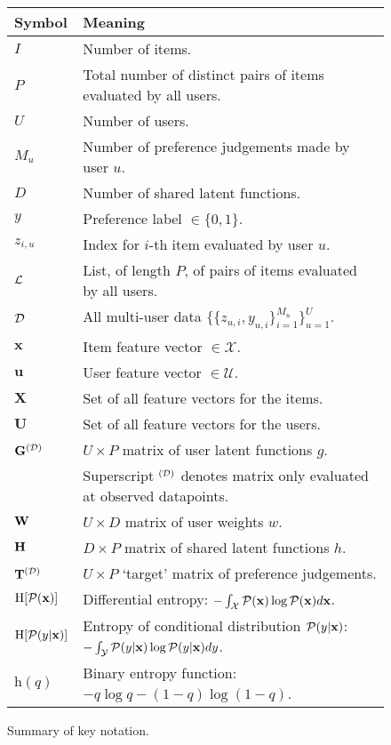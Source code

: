 \begin{figure}[t]
\begin{center}
\begin{tabular}{l|l}
 \bf{Symbol} & \bf{Meaning} \\ \hline
 \hline
 $I$ & Number of items. \\
 $P$ & Total number of distinct pairs of items evaluated by all users. \\
 $U$ & Number of users. \\ 
 $M_u$ & Number of preference judgements made by user $u$. \\
 $D$ & Number of shared latent functions. \\
 $y$ & Preference label $\in\{0,1\}.$ \\
 $z_{i,u}$ & Index for $i$-th item evaluated by user $u$. \\
 $\mathcal{L}$ & List, of length $P$, of pairs of items evaluated by all users. \\
 $\mathcal{D}$ &  All multi-user data $ \{\{z_{u,i},y_{u,i}\}_{i=1}^{M_u}\}_{u=1}^U $. \\
 $\mathbf{x}$ & Item feature vector $\in\mathcal{X}$. \\
 $\mathbf{u}$ & User feature vector $\in\mathcal{U}$. \\
 $\mathbf{X}$ & Set of all feature vectors for the items. \\
 $\mathbf{U}$ & Set of all feature vectors for the users. \\
 $\mathbf{G}^{(\mathcal{D})}$ & $U\times P$ matrix of user latent functions $g$. \\
 $ $ & \hskip1cm Superscript $^{(\mathcal{D})}$ denotes matrix only evaluated at observed datapoints. \\   
 $\mathbf{W}$ & $U\times D$ matrix of user weights $w$. \\
 $\mathbf{H}$ & $D\times P$ matrix of shared latent functions $h$. \\
 $\mathbf{T}^{(\mathcal{D})}$ & $U\times P$ `target' matrix of preference judgements. \\  
 $\mathrm{H}[\mathcal{P}(\mathbf{x})]$ & Differential entropy: $-\int_{\mathcal{X}} \mathcal{P}(\mathbf{x})\log \mathcal{P}(\mathbf{x})d\mathbf{x}$.  \\
 $\mathrm{H}[\mathcal{P}(y|\mathbf{x})]$ & Entropy of conditional distribution $\mathcal{P}(y|\mathbf{x})$: $-\int_{\mathcal{Y}} \mathcal{P}(y|\mathbf{x})\log \mathcal{P}(y|\mathbf{x})dy$.  \\
 $\mathrm{h}(q)$ & Binary entropy function: $-q\log q - (1-q)\log (1-q)$.  \\
\end{tabular}
\caption{Summary of key notation.}\label{fig:notation}
\end{center}
\end{figure}
